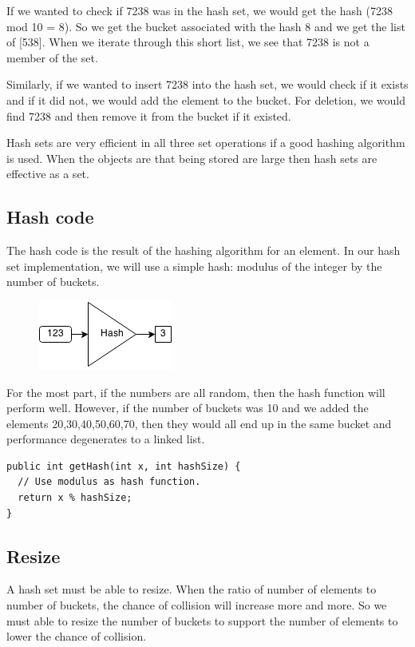 \documentclass[11pt,oneside]{book}
\makeatletter
\def\maxwidth#1{\ifdim\Gin@nat@width>#1 #1\else\Gin@nat@width\fi}
\makeatother
\begin{document}
If we wanted to check if 7238 was in the hash set, we would get the hash (7238 mod 10 = 8). So we get the bucket associated with the hash 8 and we get the list of [538]. When we iterate through this short list, we see that 7238 is not a member of the set.

Similarly, if we wanted to insert 7238 into the hash set, we would check if it exists and if it did not, we would add the element to the bucket. For deletion, we would find 7238 and then remove it from the bucket if it existed.

Hash sets are very efficient in all three set operations if a good hashing algorithm is used. When the objects are that being stored are large then hash sets are effective as a set.

\subsection{Hash code}

The hash code is the result of the hashing algorithm for an element. In our hash set implementation, we will use a simple hash: modulus of the integer by the number of buckets.

\vspace{5px}\begin{figure}[H]\centering
        \includegraphics[width=0.66\maxwidth{\textwidth}]{hashcode.png}
        \end{figure}

For the most part, if the numbers are all random, then the hash function will perform well. However, if the number of buckets was 10 and we added the elements 20,30,40,50,60,70, then they would all end up in the same bucket and performance degenerates to a linked list.

\begin{lstlisting}
public int getHash(int x, int hashSize) {
  // Use modulus as hash function.
  return x % hashSize;
}
\end{lstlisting}

\subsection{Resize}

A hash set must be able to resize. When the ratio of number of elements to number of buckets, the chance of collision will increase more and more. So we must able to resize the number of buckets to support the number of elements to lower the chance of collision.
\end{document}
